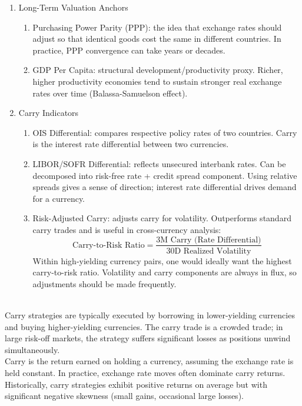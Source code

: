 \documentclass[a4paper,oneside,openany]{book}
\begin{document}
\begin{remark}
\begin{enumerate}[label=\roman*.]
\begin{enumerate}[label=\arabic*.]
\item Current Account Balance: persistent deficits require capital inflows; sudden stops trigger sharp FX adjustment.
\item FX Reserves: adequacy (months of import cover, short-term debt coverage) determines policy space.
\end{enumerate}
\item Long-Term Valuation Anchors
\begin{enumerate}[label=\arabic*.]
\setlength{\itemsep}{0pt}
\item Purchasing Power Parity (PPP): the idea that exchange rates should adjust so that identical goods cost the same in different countries. In practice, PPP convergence can take years or decades.
\item GDP Per Capita: structural development/productivity proxy. Richer, higher productivity economies tend to sustain stronger real exchange rates over time (Balassa-Samuelson effect).
\end{enumerate}
\item Carry Indicators
\begin{enumerate}[label=\arabic*.]
\setlength{\itemsep}{0pt}
\item OIS Differential: compares respective policy rates of two countries. Carry is the interest rate differential between two currencies.
\item LIBOR/SOFR Differential: reflects unsecured interbank rates. Can be decomposed into risk-free rate + credit spread component. Using relative spreads gives a sense of direction; interest rate differential drives demand for a currency.
\item Risk-Adjusted Carry: adjusts carry for volatility. Outperforms standard carry trades and is useful in cross-currency analysis:
\begin{equation*}
\text{Carry-to-Risk Ratio} = \frac{\text{3M Carry (Rate Differential)}}{\text{30D Realized Volatility}}
\end{equation*}
Within high-yielding currency pairs, one would ideally want the highest carry-to-risk ratio. Volatility and carry components are always in flux, so adjustments should be made frequently.
\end{enumerate}
\end{enumerate}
\end{remark}

\begin{remark} \\
Carry strategies are typically executed by borrowing in lower-yielding currencies and buying higher-yielding currencies. The carry trade is a crowded trade; in large risk-off markets, the strategy suffers significant losses as positions unwind simultaneously.\\
Carry is the return earned on holding a currency, assuming the exchange rate is held constant. In practice, exchange rate moves often dominate carry returns. Historically, carry strategies exhibit positive returns on average but with significant negative skewness (small gains, occasional large losses).
\end{remark}
\end{document}
